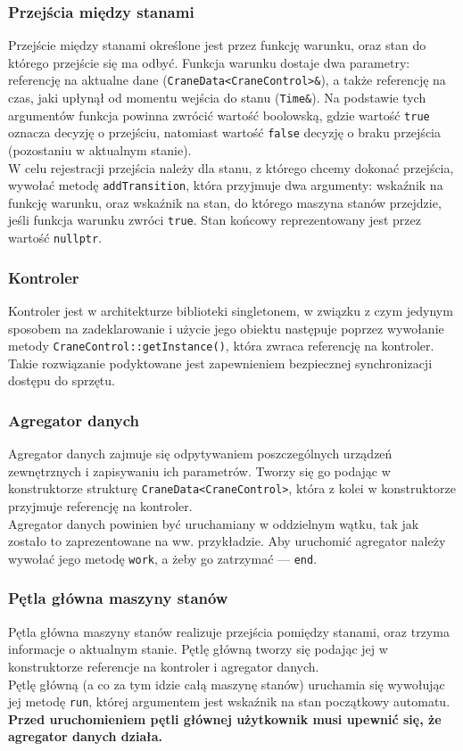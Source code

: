 \documentclass{article}
\begin{document}
\subsubsection*{Przejścia między stanami}
Przejście między stanami określone jest przez funkcję warunku, oraz stan do
którego przejście się ma odbyć. Funkcja warunku dostaje dwa parametry:
referencję na aktualne dane (\texttt{CraneData<CraneControl>\&}), a także
referencję na czas, jaki upłynął od momentu wejścia do stanu (\texttt{Time\&}).
Na podstawie tych argumentów funkcja powinna zwrócić wartość boolowską, gdzie
wartość \texttt{true} oznacza decyzję o przejściu, natomiast wartość
\texttt{false} decyzję o braku przejścia (pozostaniu w aktualnym stanie).\\
W celu rejestracji przejścia należy dla stanu, z którego chcemy dokonać
przejścia, wywołać metodę \texttt{addTransition}, która przyjmuje dwa argumenty:
wskaźnik na funkcję warunku, oraz wskaźnik na stan, do którego maszyna stanów
przejdzie, jeśli funkcja warunku zwróci \texttt{true}. Stan końcowy
reprezentowany jest przez wartość \texttt{nullptr}.
\subsubsection*{Kontroler}
Kontroler jest w architekturze biblioteki singletonem, w związku z czym jedynym
sposobem na zadeklarowanie i użycie jego obiektu następuje poprzez wywołanie
metody \texttt{CraneControl::getInstance()}, która zwraca referencję na
kontroler. Takie rozwiązanie podyktowane jest zapewnieniem bezpiecznej
synchronizacji dostępu do sprzętu.
\subsubsection*{Agregator danych}
Agregator danych zajmuje się odpytywaniem poszczególnych urządzeń zewnętrznych i
zapisywaniu ich parametrów. Tworzy się go podając w konstruktorze
strukturę \texttt{CraneData<CraneControl>}, która z kolei w konstruktorze
przyjmuje referencję na kontroler.\\
Agregator danych powinien być uruchamiany w oddzielnym wątku, tak jak zostało to
zaprezentowane na ww. przykładzie. Aby uruchomić agregator należy wywołać jego
metodę \texttt{work}, a żeby go zatrzymać --- \texttt{end}.
\subsubsection*{Pętla główna maszyny stanów}
Pętla główna maszyny stanów realizuje przejścia pomiędzy stanami, oraz trzyma
informacje o aktualnym stanie. Pętlę główną tworzy się podając jej w
konstruktorze referencje na kontroler i agregator danych.\\
Pętlę główną (a co za tym idzie całą maszynę stanów) uruchamia się wywołując jej
metodę \texttt{run}, której argumentem jest wskaźnik na stan początkowy
automatu. \textbf{Przed uruchomieniem pętli głównej użytkownik musi upewnić się,
że agregator danych działa.}
\end{document}
